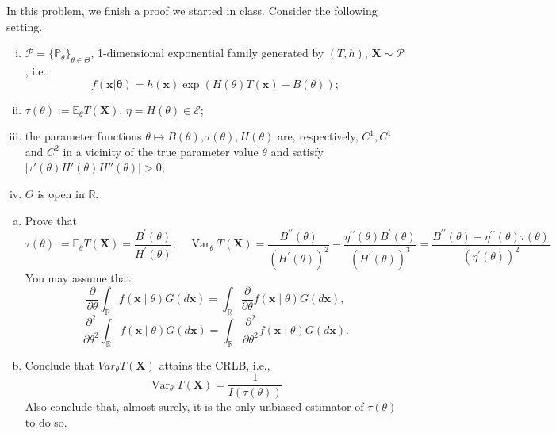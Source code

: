 \begin{ex} \label{ex:5.2}
    In this problem, we finish a proof we started in class. Consider the following setting. 
    \begin{enumerate}[(i)]
        \item $\mathcal{P}=\{\mathbb{P}_\theta\}_{\theta\in\Theta}$, 1-dimensional exponential family generated by $(T,h)$, $\mathbf{X}\sim \mathcal{P}$, i.e., 
        \[
            f(\mathbf{x|\theta})=h(\mathbf{x})\exp\left(H(\theta)T(\mathbf{x})-B(\theta)\right); 
        \]
        \item $\tau(\theta):=\mathbb{E}_\theta T(\mathbf{X})$, $\eta=H(\theta)\in\mathcal{E}$; 
        \item the parameter functions $\theta\mapsto B(\theta), \tau(\theta), H(\theta)$ are, respectively, $C^1, C^1$ and $C^2$ in a
        vicinity of the true parameter value $\theta$ and satisfy $|\tau'(\theta)H'(\theta)H''(\theta)|>0$; 
        \item $\Theta$ is open in $\mathbb{R}$. 
    \end{enumerate}
    \begin{enumerate}[(a)]
        \item Prove that
        \[
        \tau(\theta):=\mathbb{E}_{\theta} T(\mathbf{X})=\frac{B^{\prime}(\theta)}{H^{\prime}(\theta)}, \quad \operatorname{Var}_{\theta} T(\mathbf{X})=\frac{B^{\prime \prime}(\theta)}{\left(H^{\prime}(\theta)\right)^{2}}-\frac{\eta^{\prime \prime}(\theta) B^{\prime}(\theta)}{\left(H^{\prime}(\theta)\right)^{3}}=\frac{B^{\prime \prime}(\theta)-\eta^{\prime \prime}(\theta) \tau(\theta)}{\left(\eta^{\prime}(\theta)\right)^{2}}
        \]
        You may assume that
        \[
            \frac{\partial}{\partial \theta} \int_{\mathbb{R}} f(\mathbf{x} \mid \theta) G(d \mathbf{x})=\int_{\mathbb{R}} \frac{\partial}{\partial \theta} f(\mathbf{x} \mid \theta) G(d \mathbf{x}), 
        \]
        \[
            \frac{\partial^{2}}{\partial \theta^{2}} \int_{\mathbb{R}} f(\mathbf{x} \mid \theta) G(d \mathbf{x})=\int_{\mathbb{R}} \frac{\partial^{2}}{\partial \theta^{2}} f(\mathbf{x} \mid \theta) G(d \mathbf{x}). 
        \]
        \item Conclude that \(Var_{\theta} T(\mathbf{X})\) attains the CRLB, i.e.,
        \[
        \operatorname{Var}_{\theta} T(\mathbf{X})=\frac{1}{I(\tau(\theta))}
        \]
        Also conclude that, almost surely, it is the only unbiased estimator of \(\tau(\theta)\) to do so.
    \end{enumerate}
\end{ex}

